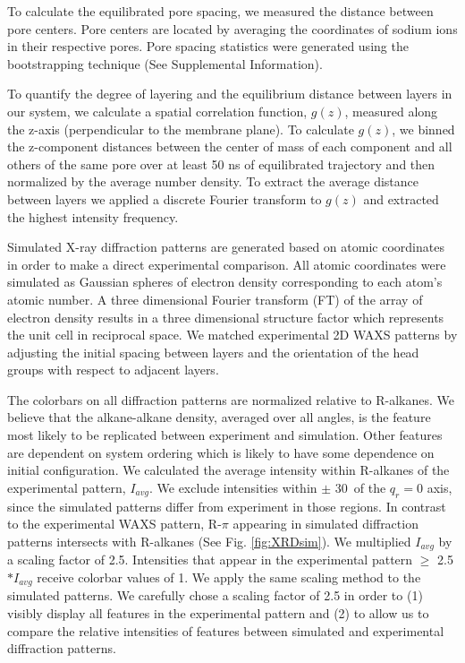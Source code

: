\documentclass{article}
\begin{document}
  To calculate the equilibrated pore spacing, we measured the distance between
  pore centers. Pore centers are located by averaging the coordinates of sodium
  ions in their respective pores. Pore spacing statistics were generated 
  using the bootstrapping technique (See Supplemental Information).

  To quantify the degree of layering and the equilibrium distance between layers
  in our system, we calculate a spatial correlation function, $g(z)$, measured
  along the z-axis (perpendicular to the membrane plane). To calculate $g(z)$,
  we binned the z-component distances between the center of mass of each
  component and all others of the same pore over at least 50 ns of equilibrated
  trajectory and then normalized by the average number density. To extract the
  average distance between layers we applied a discrete Fourier transform to
  $g(z)$ and extracted the highest intensity frequency.

  Simulated X-ray diffraction patterns are generated based on atomic
  coordinates in order to make a direct experimental comparison. All atomic
  coordinates were simulated as Gaussian spheres of electron density
  corresponding to each atom's atomic number. A three dimensional Fourier
  transform (FT) of the array of electron density results in a three dimensional
  structure factor which represents the unit cell in reciprocal space. We matched
  experimental 2D WAXS patterns by adjusting the initial spacing between layers
  and the orientation of the head groups with respect to adjacent layers.

  The colorbars on all diffraction patterns are normalized relative to
  R-alkanes. We believe that the alkane-alkane density, averaged over all angles,
  is the feature most likely to be replicated between experiment and simulation.
  Other features are dependent on system ordering which is likely to have some
  dependence on initial configuration. We calculated the average intensity within
  R-alkanes of the experimental pattern, $I_{avg}$.  We exclude intensities
  within $\pm$ 30\degree~of the $q_r=0$ axis, since the simulated patterns differ
  from experiment in those regions. In contrast to the experimental WAXS pattern,
  R-$\pi$ appearing in simulated diffraction patterns intersects with R-alkanes
  (See Fig. \ref{fig:XRDsim}). We multiplied $I_{avg}$ by a scaling factor of
  2.5. Intensities that appear in the experimental pattern $\geq$ 2.5$*I_{avg}$
  receive colorbar values of 1. We apply the same scaling method to the simulated
  patterns. We carefully chose a scaling factor of 2.5 in order to (1) visibly
  display all features in the experimental pattern and (2) to allow us to compare
  the relative intensities of features between simulated and experimental
  diffraction patterns.
\end{document}

